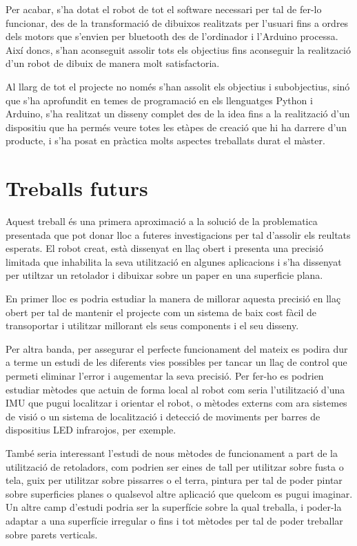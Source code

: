 Per acabar, s'ha dotat el robot de tot el software necessari per tal de fer-lo funcionar, des de la transformació de dibuixos realitzats per l'usuari fins a ordres dels motors que s'envien per bluetooth des de l'ordinador i l'Arduino processa. Així doncs, s'han aconseguit assolir tots els objectius fins aconseguir la realització d'un robot de dibuix de manera molt satisfactoria.

Al llarg de tot el projecte no només s'han assolit els objectius i subobjectius, sinó que s'ha aprofundit en temes de programació en els llenguatges Python i Arduino, s'ha realitzat un disseny complet des de la idea fins a la realització d'un dispositiu que ha permés veure totes les etàpes de creació que hi ha darrere d'un producte, i s'ha posat en pràctica molts aspectes treballats durat el màster.


\section{Treballs futurs}
Aquest treball és una primera aproximació a la solució de la problematica presentada que pot donar lloc a futeres investigacions per tal d'assolir els reultats esperats. El robot creat, està dissenyat en llaç obert  i presenta una precisió limitada que inhabilita la seva utilització en algunes aplicacions i s'ha dissenyat per utiltzar un retolador i dibuixar sobre un paper  en una superficie plana. 

En primer lloc es podria estudiar la manera de millorar aquesta precisió en llaç obert per tal de mantenir el projecte com un sistema de baix cost fàcil de transoportar i utilitzar millorant els seus components i el seu disseny. 

Per altra banda, per assegurar el perfecte funcionament del mateix es podira dur a terme un estudi de les diferents vies possibles per tancar un llaç de control que permeti eliminar l'error i augementar la seva precisió. Per fer-ho es podrien estudiar mètodes que actuin de forma local al robot com seria l'utilització d'una IMU que pugui localitzar i orientar el robot, o mètodes externs com ara sistemes de visió o un sistema de localització i detecció de moviments per barres de dispositius LED infrarojos, per exemple. 

També seria interessant l'estudi de nous mètodes de funcionament a part de la utilització de retoladors, com podrien ser eines de tall per utilitzar sobre fusta o tela, guix per utilitzar sobre pissarres o el terra, pintura per tal de poder pintar sobre superficies planes o qualsevol altre aplicació que quelcom es pugui imaginar. Un altre camp d'estudi podria ser la superfície sobre la qual treballa, i poder-la adaptar a una superfície irregular o fins i tot mètodes per tal de poder treballar sobre parets verticals. 